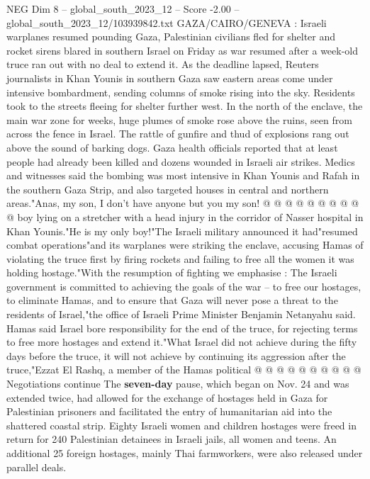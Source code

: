 \begin{textsample}{NEG Dim 8 – global\_south\_2023\_12 – Score -2.00 – global\_south\_2023\_12/103939842.txt}  \label{ex:f8_neg_014}
GAZA/CAIRO/GENEVA : Israeli warplanes resumed pounding Gaza, Palestinian civilians fled for shelter and rocket sirens blared in southern Israel on Friday as war resumed after a week-old truce ran out with no deal to extend it.
As the deadline lapsed, Reuters journalists in Khan Younis in southern Gaza saw eastern areas come under intensive bombardment, sending columns of smoke rising into the sky.
Residents took to the streets fleeing for shelter further west.
In the north of the enclave, the main war zone for weeks, huge plumes of smoke rose above the ruins, seen from across the fence in Israel.
The rattle of gunfire and thud of explosions rang out above the sound of barking dogs.
Gaza health officials reported that at least people had already been killed and dozens wounded in Israeli air strikes.
Medics and witnesses said the bombing was most intensive in Khan Younis and Rafah in the southern Gaza Strip, and also targeted houses in central and northern areas."Anas, my son, I don't have anyone but you my son! @ @ @ @ @ @ @ @ @ @ boy lying on a stretcher with a head injury in the corridor of Nasser hospital in Khan Younis."He is my only boy!"The Israeli military announced it had"resumed combat operations"and its warplanes were striking the enclave, accusing Hamas of violating the truce first by firing rockets and failing to free all the women it was holding hostage."With the resumption of fighting we emphasise : The Israeli government is committed to achieving the goals of the war -- to free our hostages, to eliminate Hamas, and to ensure that Gaza will never pose a threat to the residents of Israel,"the office of Israeli Prime Minister Benjamin Netanyahu said.
Hamas said Israel bore responsibility for the end of the truce, for rejecting terms to free more hostages and extend it."What Israel did not achieve during the fifty days before the truce, it will not achieve by continuing its aggression after the truce,"Ezzat El Rashq, a member of the Hamas political @ @ @ @ @ @ @ @ @ @ Negotiations continue The \textbf{seven-day} pause, which began on Nov. 24 and was extended twice, had allowed for the exchange of hostages held in Gaza for Palestinian prisoners and facilitated the entry of humanitarian aid into the shattered coastal strip.
Eighty Israeli women and children hostages were freed in return for 240 Palestinian detainees in Israeli jails, all women and teens.
An additional 25 foreign hostages, mainly Thai farmworkers, were also released under parallel deals.

\end{textsample}
